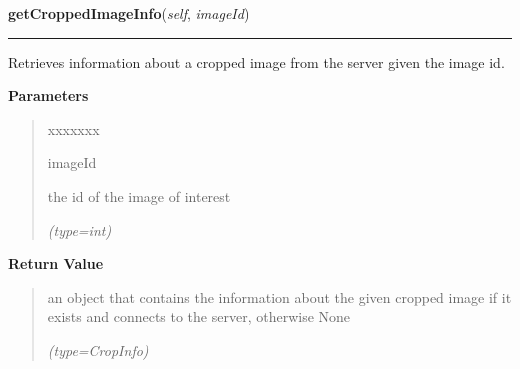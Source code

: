     \label{client_rest:ImagingInterface:getCroppedImageInfo}

    \vspace{0.5ex}

\hspace{.8\funcindent}\begin{boxedminipage}{\funcwidth}

    \raggedright \textbf{getCroppedImageInfo}(\textit{self}, \textit{imageId})

    \vspace{-1.5ex}

    \rule{\textwidth}{0.5\fboxrule}
\setlength{\parskip}{2ex}
    Retrieves information about a cropped image from the server given the 
    image id.

\setlength{\parskip}{1ex}
      \textbf{Parameters}
      \vspace{-1ex}

      \begin{quote}
        \begin{Ventry}{xxxxxxx}

          \item[imageId]

          the id of the image of interest

            {\it (type=int)}

        \end{Ventry}

      \end{quote}

      \textbf{Return Value}
    \vspace{-1ex}

      \begin{quote}
      an object that contains the information about the given cropped image
      if it exists and connects to the server, otherwise None

      {\it (type=CropInfo)}

      \end{quote}

    \end{boxedminipage}

    \label{client_rest:ImagingInterface:getAllCroppedInfo}

